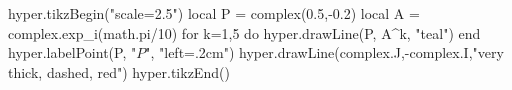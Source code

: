 \documentclass[margin=.2cm,multi,tikz]{standalone}
\begin{document}
\begin{luacode*}
hyper.tikzBegin("scale=2.5")
local P = complex(0.5,-0.2)
local A = complex.exp_i(math.pi/10)
for k=1,5 do hyper.drawLine(P, A^k, "teal") end
hyper.labelPoint(P, "$P$", "left=.2cm")
hyper.drawLine(complex.J,-complex.I,"very thick, dashed, red")
hyper.tikzEnd()
\end{luacode*}
\end{document}
